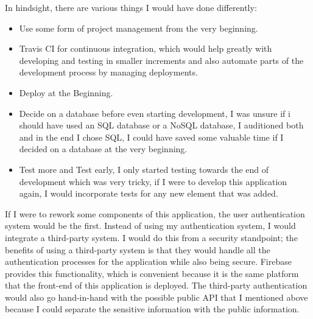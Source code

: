 In hindsight, there are various things I would have done differently:
\begin{itemize}
	\item Use some form of project management from the very beginning.
	\item Travis CI for continuous integration, which would help greatly with developing and testing in smaller increments and also automate parts of the development process by managing deployments.
	\item Deploy at the Beginning.
	\item Decide on a database before even starting development, I was unsure if i should have used an SQL database or a NoSQL database, I auditioned both and in the end I chose SQL, I could have saved some valuable time if I decided on a database at the very beginning.
	\item Test more and Test early, I only started testing towards the end of development which was very tricky, if I were to develop this application again, I would incorporate tests for any new element that was added.
\end{itemize}

If I were to rework some components of this application, the user authentication system would be the first. Instead of using my authentication system, I would integrate a third-party system. I would do this from a security standpoint; the benefits of using a third-party system is that they would handle all the authentication processes for the application while also being secure. Firebase provides this functionality, which is convenient because it is the same platform that the front-end of this application is deployed. The third-party authentication would also go hand-in-hand with the possible public API that I mentioned above because I could separate the sensitive information with the public information. \hfill \bigbreak

